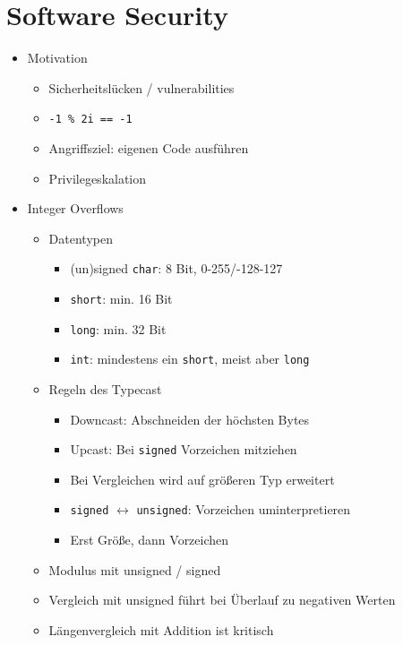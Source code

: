 \documentclass[11pt, paper=a4, twocolumn]{scrartcl}
\begin{document}
\section{Software Security}
	\begin{itemize}
		\item Motivation
			\begin{itemize}
				\item Sicherheitslücken / vulnerabilities
				\item \texttt{-1 \% 2i == -1}
				\item Angriffsziel: eigenen Code ausführen
				\item Privilegeskalation
			\end{itemize}

		\item Integer Overflows
			\begin{itemize}
				\item Datentypen
					\begin{itemize}
						\item (un)signed \texttt{char}: 8 Bit, 
							0-255/-128-127
						\item \texttt{short}: min. 16 Bit
						\item \texttt{long}: min. 32 Bit
						\item \texttt{int}: mindestens ein 
							\texttt{short}, meist aber 
							\texttt{long}
					\end{itemize}
				\item Regeln des Typecast
					\begin{itemize}
						\item Downcast: Abschneiden der höchsten 
							Bytes 
						\item Upcast: Bei \texttt{signed} 
							Vorzeichen mitziehen
						\item Bei Vergleichen wird auf größeren 
							Typ erweitert
						\item \texttt{signed} $\leftrightarrow$ 
							\texttt{unsigned}: Vorzeichen 
							uminterpretieren
						\item Erst Größe, dann Vorzeichen
					\end{itemize}
				\item Modulus mit unsigned / signed
				\item Vergleich mit unsigned führt bei Überlauf zu 
					negativen Werten
				\item Längenvergleich mit Addition ist kritisch
			\end{itemize}


\end{itemize}
\end{document}
